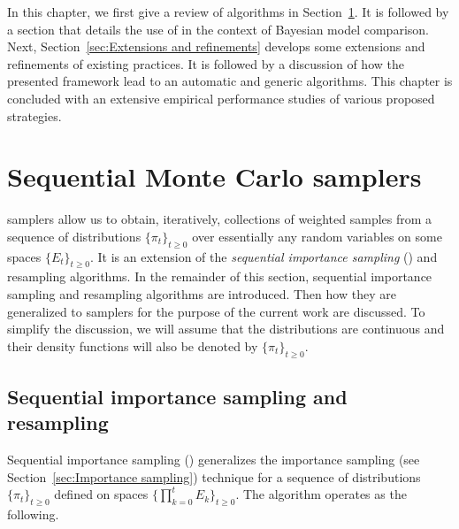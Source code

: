 In this chapter, we first give a review of \smc algorithms in Section~\ref{sec:Sequential Monte Carlo samplers}. It is followed by a section that details the use of \smc in the context of Bayesian model comparison. Next, Section~\ref{sec:Extensions and refinements} develops some extensions and refinements of existing practices. It is followed by a discussion of how the presented framework lead to an automatic and generic algorithms. This chapter is concluded with an extensive empirical performance studies of various proposed strategies.

\section{Sequential Monte Carlo samplers}
\label{sec:Sequential Monte Carlo samplers}

\smc samplers allow us to obtain, iteratively, collections of weighted samples from a sequence of distributions $\{\pi_t\}_{t\ge0}$ over essentially any random variables on some spaces $\{E_t\}_{t\ge0}$. It is an extension of the \emph{sequential importance sampling} (\sis) and resampling algorithms. In the remainder of this section, sequential importance sampling and resampling algorithms are introduced. Then how they are generalized to \smc samplers for the purpose of the current work are discussed. To simplify the discussion, we will assume that the distributions are continuous and their density functions will also be denoted by $\{\pi_t\}_{t\ge0}$.

\subsection{Sequential importance sampling and resampling}
\label{sub:Sequential importance sampling and resampling}

Sequential importance sampling (\sis) generalizes the importance sampling (see Section~\ref{sec:Importance sampling}) technique for a sequence of distributions $\{\pi_t\}_{t\ge0}$ defined on spaces $\{\prod_{k=0}^tE_k\}_{t\ge0}$. The algorithm operates as the following.

